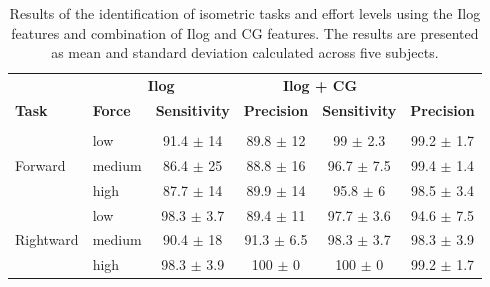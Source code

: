 \begin{table}[]
\centering
\caption{Results of the identification of isometric tasks and effort levels using the Ilog features and combination of Ilog and CG features. The results are presented as mean and standard deviation calculated across five subjects.}
\label{tb:4-2}
\begin{tabular}{llcccc}
              & \multicolumn{2}{c}{\textbf{Ilog}}                            & \multicolumn{2}{c}{\textbf{Ilog + CG}}                       \\
\textbf{Task} & \textbf{Force} & \textbf{Sensitivity}                          & \textbf{Precision}                           & \textbf{Sensitivity}                         & \textbf{Precision}                          \\ \hline
              &                &                                               &                                              &                                             &                                             \\
              & low            & 91.4 $\pm$ 14                                 & 89.8 $\pm$ 12                                & 99 $\pm$ 2.3                                & 99.2 $\pm$ 1.7                              \\
Forward       & medium         & 86.4 $\pm$ 25                                 & 88.8 $\pm$ 16                                & 96.7 $\pm$ 7.5                              & 99.4 $\pm$ 1.4                              \\
              & high           & 87.7 $\pm$ 14                                 & 89.9 $\pm$ 14                                & 95.8 $\pm$ 6                                & 98.5 $\pm$ 3.4                              \\ \hline
              & low            & 98.3 $\pm$ 3.7                                & 89.4 $\pm$ 11                                & 97.7 $\pm$ 3.6                              & 94.6 $\pm$ 7.5                              \\
Rightward     & medium         & 90.4 $\pm$ 18                                 & 91.3 $\pm$ 6.5                               & 98.3 $\pm$ 3.7                              & 98.3 $\pm$ 3.9                              \\
              & high           & 98.3 $\pm$ 3.9                                & 100 $\pm$ 0                                  & 100 $\pm$ 0                                 & 99.2 $\pm$ 1.7                              \\ \hline

\end{tabular}
\end{table}
